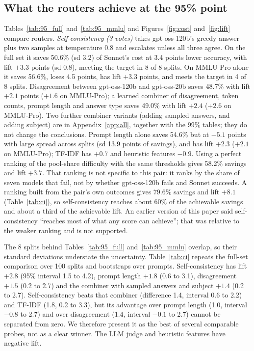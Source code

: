 \documentclass[11pt]{article}
\begin{document}
\subsection{What the routers achieve at the 95\% point}
Tables~\ref{tab:95_full} and~\ref{tab:95_mmlu} and Figures~\ref{fig:cost} and~\ref{fig:lift} compare routers. \emph{Self-consistency (3 votes)} takes gpt-oss-120b's greedy answer plus two samples at temperature 0.8 and escalates unless all three agree. On the full set it saves 50.6\% (sd 3.2) of Sonnet's cost at 3.4 points lower accuracy, with lift $+3.3$ points (sd 0.8), meeting the target in 8 of 8 splits. On MMLU-Pro alone it saves 56.6\%, loses 4.5 points, has lift $+3.3$ points, and meets the target in 4 of 8 splits. Disagreement between gpt-oss-120b and gpt-oss-20b saves 48.7\% with lift $+2.1$ points ($+1.6$ on MMLU-Pro); a learned combiner of disagreement, token counts, prompt length and answer type saves 49.0\% with lift $+2.4$ ($+2.6$ on MMLU-Pro). Two further combiner variants (adding sampled answers, and adding subject) are in Appendix~\ref{app:all}, together with the 99\% tables; they do not change the conclusions. Prompt length alone saves 54.6\% but at $-5.1$ points with large spread across splits (sd 13.9 points of savings), and has lift $+2.3$ ($+2.1$ on MMLU-Pro); TF-IDF has $+0.7$ and heuristic features $-0.9$. Using a perfect ranking of the pool-share difficulty with the same thresholds gives 58.2\% savings and lift $+3.7$. That ranking is not specific to this pair: it ranks by the share of seven models that fail, not by whether gpt-oss-120b fails and Sonnet succeeds. A ranking built from the pair's own outcomes gives 79.6\% savings and lift $+8.1$ (Table~\ref{tab:ci}), so self-consistency reaches about 60\% of the achievable savings and about a third of the achievable lift. An earlier version of this paper said self-consistency ``reaches most of what any score can achieve''; that was relative to the weaker ranking and is not supported.

The 8 splits behind Tables~\ref{tab:95_full} and~\ref{tab:95_mmlu} overlap, so their standard deviations understate the uncertainty. Table~\ref{tab:ci} repeats the full-set comparison over 100 splits and bootstraps over prompts. Self-consistency has lift $+2.8$ (95\% interval 1.5 to 4.2), prompt length $+1.8$ (0.6 to 3.1), disagreement $+1.5$ (0.2 to 2.7) and the combiner with sampled answers and subject $+1.4$ (0.2 to 2.7). Self-consistency beats that combiner (difference 1.4, interval 0.6 to 2.2) and TF-IDF (1.8, 0.2 to 3.3), but its advantage over prompt length (1.0, interval $-0.8$ to 2.7) and over disagreement (1.4, interval $-0.1$ to 2.7) cannot be separated from zero. We therefore present it as the best of several comparable probes, not as a clear winner. The LLM judge and heuristic features have negative lift.
\end{document}
